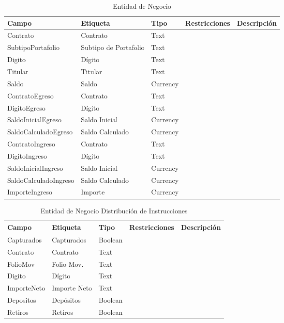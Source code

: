 \begin{table}[H]
	\caption{Entidad de Negocio }
	\label{tab:fields-dom-InstruccionEfectivo}
	\begin{center}
	\begin{tabularx}{0.90\linewidth}{ X X X X X }
		\hline
		\textbf{Campo} &
		\textbf{Etiqueta} &
		\textbf{Tipo} &
		\textbf{Restricciones} &
		\textbf{Descripci\'on} \\
		\hline
		Contrato &
		Contrato &
		Text &
		 &
		 \\
		SubtipoPortafolio &
		Subtipo de Portafolio &
		Text &
		 &
		 \\
		Digito &
		D\'igito &
		Text &
		 &
		 \\
		Titular &
		Titular &
		Text &
		 &
		 \\
		Saldo &
		Saldo &
		Currency &
		 &
		 \\
		ContratoEgreso &
		Contrato &
		Text &
		 &
		 \\
		DigitoEgreso &
		D\'igito &
		Text &
		 &
		 \\
		SaldoInicialEgreso &
		Saldo Inicial &
		Currency &
		 &
		 \\
		SaldoCalculadoEgreso &
		Saldo Calculado &
		Currency &
		 &
		 \\
		ContratoIngreso &
		Contrato &
		Text &
		 &
		 \\
		DigitoIngreso &
		D\'igito &
		Text &
		 &
		 \\
		SaldoInicialIngreso &
		Saldo Inicial &
		Currency &
		 &
		 \\
		SaldoCalculadoIngreso &
		Saldo Calculado &
		Currency &
		 &
		 \\
		ImporteIngreso &
		Importe &
		Currency &
		 &
		 \\
		\hline
	\end{tabularx}
	\end{center}
\end{table}
\begin{table}[H]
	\caption{Entidad de Negocio Distribuci\'on de Instrucciones}
	\label{tab:fields-dom-DistribucionInstrucciones}
	\begin{center}
	\begin{tabularx}{0.90\linewidth}{ X X X X X }
		\hline
		\textbf{Campo} &
		\textbf{Etiqueta} &
		\textbf{Tipo} &
		\textbf{Restricciones} &
		\textbf{Descripci\'on} \\
		\hline
		Capturados &
		Capturados &
		Boolean &
		 &
		 \\
		Contrato &
		Contrato &
		Text &
		 &
		 \\
		FolioMov &
		Folio Mov. &
		Text &
		 &
		 \\
		Digito &
		D\'igito &
		Text &
		 &
		 \\
		ImporteNeto &
		Importe Neto &
		Text &
		 &
		 \\
		Depositos &
		Dep\'ositos &
		Boolean &
		 &
		 \\
		Retiros &
		Retiros &
		Boolean &
		 &
		 \\
		\hline
	\end{tabularx}
	\end{center}
\end{table}
